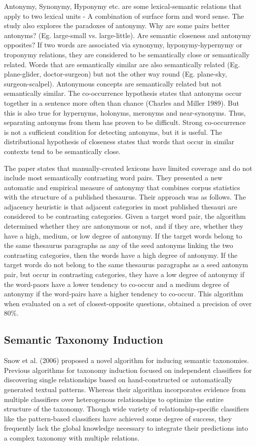 \documentclass[11pt]{article}
\begin{document}
Antonymy, Synonymy, Hyponymy etc. are some lexical-semantic relations that apply to two lexical units - A combination of surface form and word sense. The study also explores the paradoxes of antonymy. Why are some pairs better antonyms? (Eg. large-small vs. large-little). Are semantic closeness and antonymy opposites? If two words are associated via synonymy, hyponymy-hypernymy or troponymy relations, they are considered to be semantically close or semantically related. Words that are semantically similar are also semantically related (Eg. plane-glider, doctor-surgeon) but not the other way round (Eg. plane-sky, surgeon-scalpel). Antonymous concepts are semantically related but not semantically similar. The co-occurrence hypothesis states that antonyms occur together in a sentence more often than chance (Charles and Miller 1989). But this is also true for hypernyms, holonyms, meronyms and near-synonyms. Thus, separating antonyms from them has proven to be difficult. Strong co-occurrence is not a sufficient condition for detecting antonyms, but it is useful. The distributional hypothesis of closeness states that words that occur in similar contexts tend to be semantically close.

The paper states that manually-created lexicons have limited coverage and do not include most semantically contrasting word pairs. They presented a new automatic and empirical measure of antonymy that combines corpus statistics with the structure of a published thesaurus. Their approach was as follows. The adjacency heuristic is that adjacent categories in most published thesauri are considered to be contrasting categories. Given a target word pair, the algorithm determined whether they are antonymous or not, and if they are, whether they have a high, medium, or low degree of antonymy. If the target words belong to the same thesaurus paragraphs as any of the seed antonyms linking the two contrasting categories, then the words have a high degree of antonymy. If the target words do not belong to the same thesaurus paragraphs as a seed antonym pair, but occur in contrasting categories, they have a low degree of antonymy if the word-paors have a lower tendency to co-occur and a medium degree of antonymy if the word-pairs have a higher tendency to co-occur. This algorithm when evaluated on a set of closest-opposite questions, obtained a precision
of over 80\%. 

\subsection{Semantic Taxonomy Induction}
Snow et al. (2006) proposed a novel algorithm for inducing semantic taxonomies. Previous algorithms for taxonomy induction focused on independent classifiers for discovering single relationships based on hand-constructed or automatically generated textual patterns. Whereas their algorithm incorporates evidence from multiple classifiers over heterogenous relationships to optimize the entire structure of the taxonomy. Though wide variety of relationship-specific classifiers like the pattern-based classifiers have achieved some degree of success, they frequently lack the global knowledge necessary to integrate their predictions into a complex taxonomy with multiple relations. 
\end{document}
